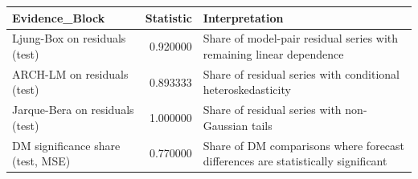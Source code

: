 \begin{tabular}{lrl}
\toprule
Evidence_Block & Statistic & Interpretation \\
\midrule
Ljung-Box on residuals (test) & 0.920000 & Share of model-pair residual series with remaining linear dependence \\
ARCH-LM on residuals (test) & 0.893333 & Share of residual series with conditional heteroskedasticity \\
Jarque-Bera on residuals (test) & 1.000000 & Share of residual series with non-Gaussian tails \\
DM significance share (test, MSE) & 0.770000 & Share of DM comparisons where forecast differences are statistically significant \\
\bottomrule
\end{tabular}
